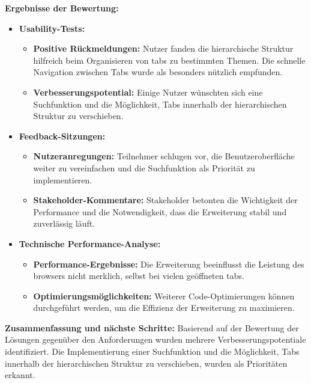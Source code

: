 \textbf{Ergebnisse der Bewertung:}
\begin{itemize}
    \item \textbf{Usability-Tests:}
    \begin{itemize}
        \item \textbf{Positive Rückmeldungen:} Nutzer fanden die hierarchische Struktur hilfreich beim Organisieren von \gls{tab}s zu bestimmten Themen. Die schnelle Navigation zwischen Tabs wurde als besonders nützlich empfunden.
        \item \textbf{Verbesserungspotential:} Einige Nutzer wünschten sich eine Suchfunktion und die Möglichkeit, Tabs innerhalb der hierarchischen Struktur zu verschieben.
    \end{itemize}
    \item \textbf{Feedback-Sitzungen:}
    \begin{itemize}
        \item \textbf{Nutzeranregungen:} Teilnehmer schlugen vor, die Benutzeroberfläche weiter zu vereinfachen und die Suchfunktion als Priorität zu implementieren.
        \item \textbf{Stakeholder-Kommentare:} Stakeholder betonten die Wichtigkeit der Performance und die Notwendigkeit, dass die Erweiterung stabil und zuverlässig läuft.
    \end{itemize}
    \item \textbf{Technische Performance-Analyse:}
    \begin{itemize}
        \item \textbf{Performance-Ergebnisse:} Die Erweiterung beeinflusst die Leistung des \gls{browser}s nicht merklich, selbst bei vielen geöffneten \gls{tab}s.
        \item \textbf{Optimierungsmöglichkeiten:} Weiterer Code-Optimierungen können durchgeführt werden, um die Effizienz der Erweiterung zu maximieren.
    \end{itemize}
\end{itemize}

\textbf{Zusammenfassung und nächste Schritte:}
Basierend auf der Bewertung der Lösungen gegenüber den Anforderungen wurden mehrere Verbesserungspotentiale identifiziert. Die Implementierung einer Suchfunktion und die Möglichkeit, Tabs innerhalb der hierarchischen Struktur zu verschieben, wurden als Prioritäten erkannt.

